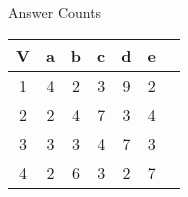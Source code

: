\renewcommand{\thepage}{\noindent VAR_COURSE_CODE, VAR_TERM, VAR_EXAM_TITLE \hfill {\bf \fbox{Answer Counts}}}
\begin{normalsize}
\begin{center}
\vspace {1cm}

\begin{Large}
Answer Counts \\
\end{Large}
\vspace {1cm}
\begin{tabular}{|c||c|c|c|c|c|c|}
\hline
V & a & b & c & d & e \\ \hline \hline
1 & 4 & 2 & 3 & 9 & 2 \\ \hline
2 & 2 & 4 & 7 & 3 & 4 \\ \hline
3 & 3 & 3 & 4 & 7 & 3 \\ \hline
4 & 2 & 6 & 3 & 2 & 7 \\ \hline
\end{tabular}
\end{center}
\end{normalsize}
\newpage
